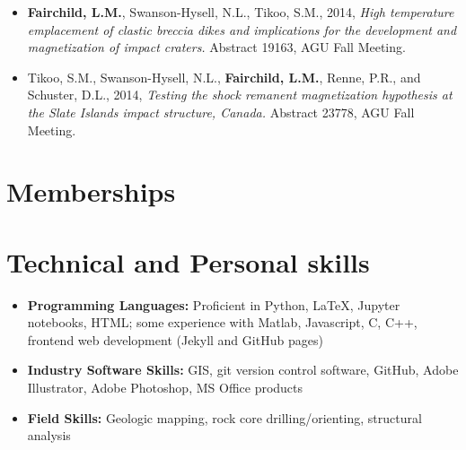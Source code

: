 \documentclass[11pt,a4paper,sans]{moderncv}        %
\begin{document}
\begin{itemize}
\item{\textbf{Fairchild, L.M.}, Swanson-Hysell, N.L., Tikoo, S.M., 2014, \textit{High temperature emplacement of clastic breccia dikes and implications for the development and magnetization of impact craters.} Abstract 19163, AGU Fall Meeting.}

\vspace{3pt}

\item{Tikoo, S.M., Swanson-Hysell, N.L., \textbf{Fairchild, L.M.}, Renne, P.R., and Schuster, D.L., 2014, \textit{Testing the shock remanent magnetization hypothesis at the Slate Islands impact structure, Canada.} Abstract 23778, AGU Fall Meeting.}

\end{itemize}

\section{Memberships}






\section{Technical and Personal skills}

\vspace{6pt}

\begin{itemize}

%

\item \textbf{Programming Languages:} Proficient in Python, LaTeX, Jupyter
    notebooks, HTML; some experience with  Matlab, Javascript, C, C{++},
    frontend web development (Jekyll and GitHub pages)

\vspace{6pt}

\item \textbf{Industry Software Skills:} GIS, git version control software,
    GitHub, Adobe Illustrator, Adobe Photoshop, MS Office products

\vspace{6pt}

\item \textbf{Field Skills:} Geologic mapping, rock core drilling/orienting, structural analysis

\end{itemize}
\end{document}
